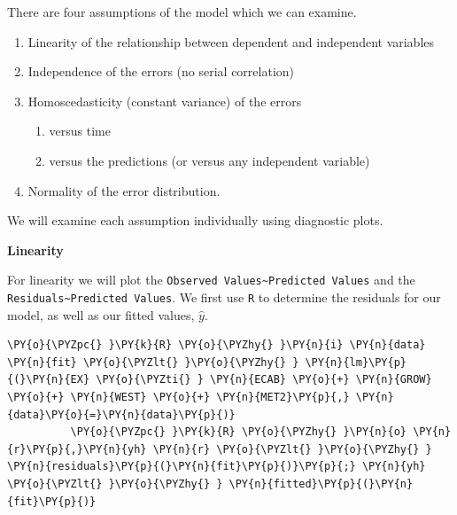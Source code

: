 \documentclass[10pt]{article}\usepackage[]{graphicx}\usepackage[]{xcolor}
\begin{document}
    There are four assumptions of the model which we can examine.

\begin{enumerate}
\def\labelenumi{\arabic{enumi}.}
\itemsep1pt\parskip0pt
\item
  Linearity of the relationship between dependent and independent
  variables
\item
  Independence of the errors (no serial correlation)
\item
  Homoscedasticity (constant variance) of the errors

  \begin{enumerate}
  \def\labelenumii{\arabic{enumii}.}
  \itemsep1pt\parskip0pt
  \item
    versus time
  \item
    versus the predictions (or versus any independent variable)
  \end{enumerate}
\item
  Normality of the error distribution.
\end{enumerate}

We will examine each assumption individually using diagnostic plots.

\textbf{Linearity}

For linearity we will plot the
\texttt{Observed Values\textasciitilde{}Predicted Values} and the
\texttt{Residuals\textasciitilde{}Predicted Values}. We first use
\texttt{R} to determine the residuals for our model, as well as our
fitted values, $\hat{y}$.

    \begin{Verbatim}[commandchars=\\\{\}]
 \PY{o}{\PYZpc{} }\PY{k}{R} \PY{o}{\PYZhy{} }\PY{n}{i} \PY{n}{data} \PY{n}{fit} \PY{o}{\PYZlt{} }\PY{o}{\PYZhy{} } \PY{n}{lm}\PY{p}{(}\PY{n}{EX} \PY{o}{\PYZti{} } \PY{n}{ECAB} \PY{o}{+} \PY{n}{GROW} \PY{o}{+} \PY{n}{WEST} \PY{o}{+} \PY{n}{MET2}\PY{p}{,} \PY{n}{data}\PY{o}{=}\PY{n}{data}\PY{p}{)}
          \PY{o}{\PYZpc{} }\PY{k}{R} \PY{o}{\PYZhy{} }\PY{n}{o} \PY{n}{r}\PY{p}{,}\PY{n}{yh} \PY{n}{r} \PY{o}{\PYZlt{} }\PY{o}{\PYZhy{} } \PY{n}{residuals}\PY{p}{(}\PY{n}{fit}\PY{p}{)}\PY{p}{;} \PY{n}{yh} \PY{o}{\PYZlt{} }\PY{o}{\PYZhy{} } \PY{n}{fitted}\PY{p}{(}\PY{n}{fit}\PY{p}{)}
\end{Verbatim}
\end{document}
